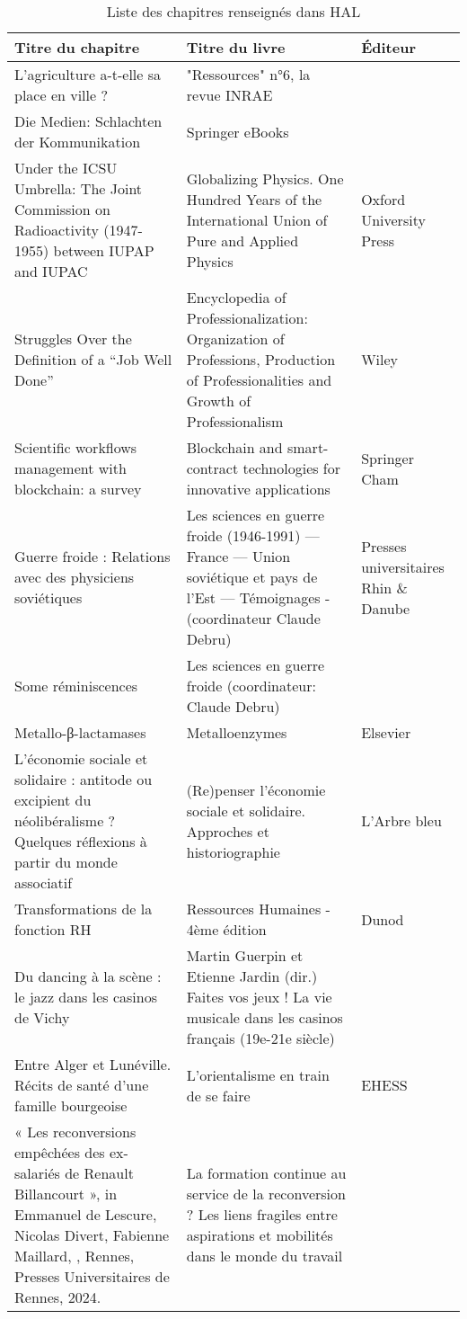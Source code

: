 \begin{longtable}{p{.4\linewidth}p{.35\linewidth}p{.15\linewidth}}
\caption{Liste des chapitres renseignés dans HAL}
\label{tab_chapters}\\
\toprule
Titre du chapitre & Titre du livre & Éditeur \\
\midrule
L'agriculture a-t-elle sa place en ville ? & "Ressources" n°6, la revue INRAE &  \\
Die Medien: Schlachten der Kommunikation & Springer eBooks &  \\
Under the ICSU Umbrella: The Joint Commission on Radioactivity (1947-1955) between IUPAP and IUPAC & Globalizing Physics. One Hundred Years of the International Union of Pure and Applied Physics & Oxford University Press \\
Struggles Over the Definition of a “Job Well Done” & Encyclopedia of Professionalization: Organization of Professions, Production of Professionalities and Growth of Professionalism & Wiley \\
Scientific workflows management with blockchain: a survey & Blockchain and smart-contract technologies for innovative applications & Springer Cham \\
Guerre froide : Relations avec des physiciens soviétiques & Les sciences en guerre froide (1946-1991) — France — Union soviétique et pays de l'Est — Témoignages - (coordinateur Claude Debru) & Presses universitaires Rhin \& Danube \\
Some réminiscences & Les sciences en guerre froide (coordinateur: Claude Debru) &  \\
Metallo-β-lactamases & Metalloenzymes & Elsevier \\
L'économie sociale et solidaire : antitode ou excipient du néolibéralisme ? Quelques réflexions à partir du monde associatif & (Re)penser l'économie sociale et solidaire. Approches et historiographie & L'Arbre bleu \\
Transformations de la fonction RH & Ressources Humaines - 4ème édition & Dunod \\
Du dancing à la scène : le jazz dans les casinos de Vichy & Martin Guerpin et Etienne Jardin (dir.) Faites vos jeux ! La vie musicale dans les casinos français (19e-21e siècle) &  \\
Entre Alger et Lunéville. Récits de santé d’une famille bourgeoise & L’orientalisme en train de se faire & EHESS \\
« Les reconversions empêchées des ex-salariés de Renault Billancourt », in Emmanuel de Lescure, Nicolas Divert, Fabienne Maillard, , Rennes, Presses Universitaires de Rennes, 2024. & La formation continue au service de la reconversion ? Les liens fragiles entre aspirations et mobilités dans le monde du travail &  \\

\end{longtable}
